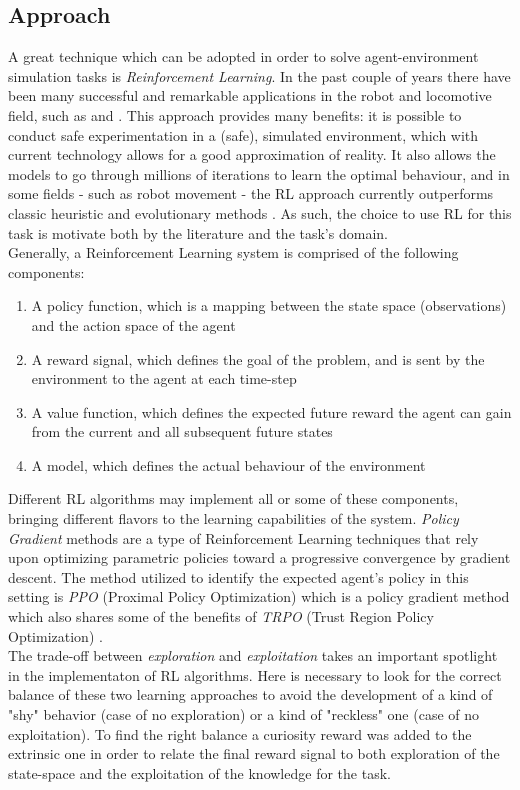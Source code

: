 \documentclass{ifacconf}
\begin{document}
\subsection{Approach} 
A great technique which can be adopted in order to solve agent-environment simulation tasks is \emph{Reinforcement Learning}. In the past couple of years there have been many successful and remarkable applications in the robot and locomotive field, such as \citep{heess2017emergence} and \citep{wenhao2018}. This approach provides many benefits: it is possible to conduct safe experimentation in a (safe), simulated environment, which with current technology allows for a good approximation of reality.  It also allows the models to go through millions of iterations to learn the optimal behaviour, and in some fields - such as robot movement - the RL approach currently outperforms classic heuristic and evolutionary methods \citep{suttonbarto}.
As such, the choice to use RL for this task is motivate both by the literature and the task's domain. \\
Generally, a Reinforcement Learning system is comprised of the following components:
\begin{enumerate}
    \item A policy function, which is a mapping between the state space (observations) and the action space of the agent
    \item A reward signal, which defines the goal of the problem, and is sent by the environment to the agent at each time-step
    \item A value function, which defines the expected future reward the agent can gain from the current and all subsequent future states
    \item A model, which defines the actual behaviour of the environment
\end{enumerate}
Different RL algorithms may implement all or some of these components, bringing different flavors to the learning capabilities of the system.
\emph{Policy Gradient} methods are a type of Reinforcement Learning techniques that rely upon optimizing parametric policies toward a progressive convergence by gradient descent. The method utilized to identify the expected agent's policy in this setting is \emph{PPO} (Proximal Policy Optimization) which is a policy gradient method which also shares some of the benefits of \emph{TRPO} (Trust Region Policy Optimization) \citep{ppo}.\\
The trade-off between \emph{exploration} and \emph{exploitation} takes an important spotlight in the implementaton of RL algorithms. Here is necessary to look for the correct balance of these two learning approaches to avoid the development of a kind of "shy" behavior (case of no exploration) or a kind of "reckless" one (case of no exploitation). To find the right balance a curiosity reward was added to the extrinsic one in order to relate the final reward signal to both exploration of the state-space and the exploitation of the knowledge for the task.
\end{document}
